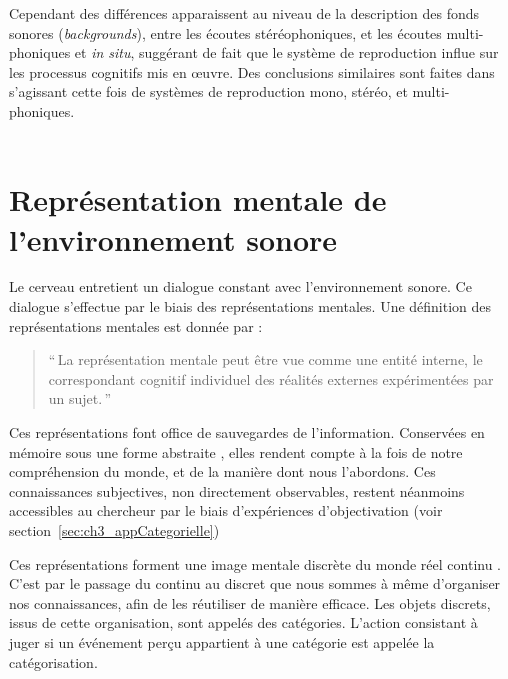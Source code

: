 {Cependant des différences apparaissent au niveau de la description des fonds sonores (\emph{backgrounds}), entre les écoutes stéréophoniques, et les écoutes multi-phoniques et \emph{in situ}, suggérant de fait que le système de reproduction influe sur les processus cognitifs mis en œuvre. Des conclusions similaires sont faites dans \citep{guastavino2004perceptual} s'agissant cette fois de systèmes de reproduction mono, stéréo, et multi-phoniques. \\

 \\

\section{Représentation mentale de l'environnement sonore}
\label{sec:ch3_representationMentale}
 
 
Le cerveau entretient un dialogue constant avec l'environnement sonore. Ce dialogue s'effectue par le biais des représentations mentales. Une définition des représentations mentales est donnée par \citep{houde1998vocabulaire}:

\begin{quote}
``\,La représentation mentale peut être vue comme une entité interne, le correspondant cognitif individuel des réalités externes expérimentées par un sujet.\,''
\end{quote}

Ces représentations font office de sauvegardes de l'information. Conservées en mémoire sous une forme abstraite \citep[p. 357]{mcadams1994penser}, elles rendent compte à la fois de notre compréhension du monde, et de la manière dont nous l'abordons. Ces connaissances subjectives, non directement observables, restent néanmoins accessibles au chercheur par le biais d'expériences d'objectivation (voir section~\ref{sec:ch3_appCategorielle})
 
Ces représentations forment une image mentale discrète du monde réel continu \citep{houde1998vocabulaire}. C'est par le passage du continu au discret que nous sommes à même d'organiser nos connaissances, afin de les réutiliser de manière efficace. Les objets discrets, issus de cette organisation, sont appelés des catégories. L'action consistant à juger si un événement perçu appartient à une catégorie est appelée la catégorisation.

}
